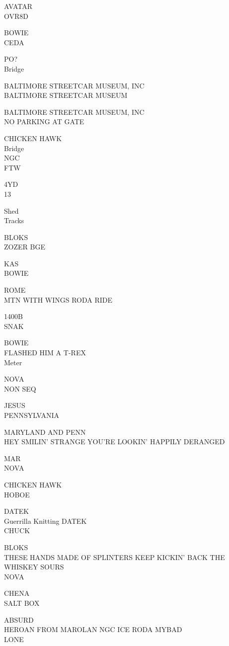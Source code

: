 \documentclass[10pt,letterpaper]{article}
\begin{document}
AVATAR\\
OVR8D

BOWIE\\
CEDA

PO?\\
Bridge

BALTIMORE STREETCAR MUSEUM, INC\\
BALTIMORE STREETCAR MUSEUM

BALTIMORE STREETCAR MUSEUM, INC\\
NO PARKING AT GATE

CHICKEN HAWK\\
Bridge\\
NGC\\
FTW

4YD\\
13

Shed\\
Tracks

BLOKS\\
ZOZER BGE

KAS\\
BOWIE

ROME\\
MTN WITH WINGS RODA RIDE

1400B\\
SNAK

BOWIE\\
FLASHED HIM A T{-}REX\\
Meter

NOVA\\
NON SEQ

JESUS\\
PENNSYLVANIA

MARYLAND AND PENN\\
HEY SMILIN' STRANGE YOU'RE LOOKIN' HAPPILY DERANGED

MAR\\
NOVA

CHICKEN HAWK\\
HOBOE

DATEK\\
Guerrilla Knitting DATEK\\
CHUCK

BLOKS\\
THESE HANDS MADE OF SPLINTERS KEEP KICKIN' BACK THE WHISKEY SOURS\\
NOVA

CHENA\\
SALT BOX

ABSURD\\
HEROAN FROM MAROLAN NGC ICE RODA MYBAD\\
LONE
\end{document}
